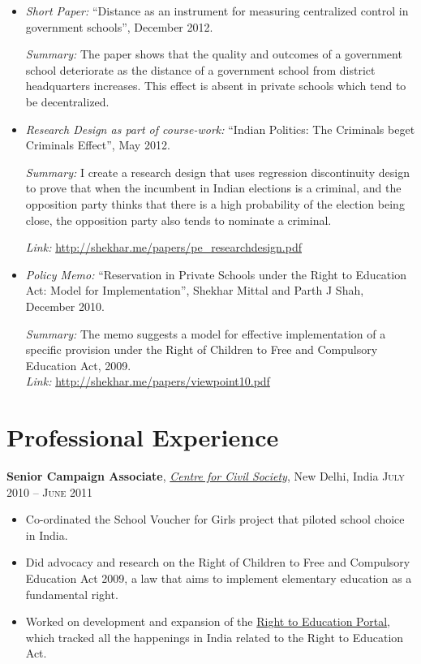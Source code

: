 \documentclass[11pt]{article}
\begin{document}
\begin{itemize}
\item \emph{Short Paper:} ``Distance as an instrument for measuring
  centralized control in government schools'', December 2012.

  \emph{Summary:} The paper shows that the quality and outcomes of a
  government school deteriorate as the distance of a government school
  from district headquarters increases. This effect is absent in
  private schools which tend to be decentralized.
\item \emph{Research Design as part of course-work:} ``Indian Politics: The
  Criminals beget Criminals Effect'', May 2012.
 
  \emph{Summary:} I create a research design that uses regression
  discontinuity design to prove that when the incumbent in Indian
  elections is a criminal, and the opposition party thinks that there
  is a high probability of the election being close, the opposition
  party also tends to nominate a criminal.

  \emph{Link:} \href{http://shekhar.me/papers/pe_researchdesign.pdf}{http://shekhar.me/papers/pe\_researchdesign.pdf}
\end{itemize}


\begin{itemize}
\item \emph{Policy Memo:} ``Reservation in Private Schools under the Right
  to Education Act: Model for Implementation'', Shekhar Mittal and
  Parth J Shah, December 2010.

  \emph{Summary:} The memo suggests a model for effective
  implementation of a specific provision under the Right of Children
  to Free and Compulsory Education Act, 2009. \\

  \emph{Link:} \href{http://shekhar.me/papers/viewpoint10.pdf}{http://shekhar.me/papers/viewpoint10.pdf}
\end{itemize}
\section{Professional Experience}
\label{sec-4}

\flushleft
\textbf{Senior Campaign Associate}, \emph{\href{http://ccs.in}{Centre for Civil Society}}, New Delhi,
India \hfill \textsc{\normalsize July 2010 -- June 2011}\\
\begin{itemize}
\item Co-ordinated the School Voucher for Girls project that piloted school choice in India.
\item Did advocacy and research on the Right of Children to Free and Compulsory Education Act 2009, a law that aims to implement elementary education as a fundamental right.
\item Worked on development and expansion of the \href{http://righttoeducation.in}{Right to Education Portal}, which tracked all the happenings in India related to the Right to Education Act. \\
\end{itemize}
\vspace{0.6em}
\end{document}
